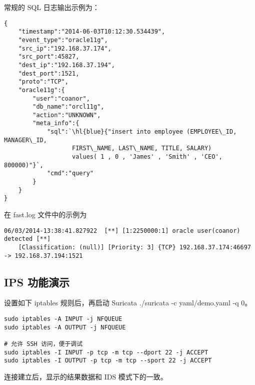 常规的 SQL 日志输出示例为：

\begin{lstlisting}
{
    "timestamp":"2014-06-03T10:12:30.534439",
    "event_type":"oracle11g",
    "src_ip":"192.168.37.174",
    "src_port":45827,
    "dest_ip":"192.168.37.194",
    "dest_port":1521,
    "proto":"TCP",
    "oracle11g":{
        "user":"coanor",
        "db_name":"orcl11g",
        "action":"UNKNOWN",
        "meta_info":{
            "sql":`\hl{blue}{"insert into employee (EMPLOYEE\_ID, MANAGER\_ID,
                   FIRST\_NAME, LAST\_NAME, TITLE, SALARY)
                   values( 1 , 0 , 'James' , 'Smith' , 'CEO', 800000)"}`,
            "cmd":"query"
        }
    }
}
\end{lstlisting}

在 {\ff fast.log} 文件中的示例为

\begin{lstlisting}
06/03/2014-13:38:41.827922  [**] [1:2250000:1] oracle user(coanor) detected [**]
    [Classification: (null)] [Priority: 3] {TCP} 192.168.37.174:46697 -> 192.168.37.194:1521
\end{lstlisting}

\subsection{IPS 功能演示}

设置如下 iptables 规则后，再启动 Suricata {\cf ./suricata -c yaml/demo.yaml -q 0}。

\begin{lstlisting}
sudo iptables -A INPUT -j NFQUEUE
sudo iptables -A OUTPUT -j NFQUEUE

# 允许 SSH 访问，便于调试
sudo iptables -I INPUT -p tcp -m tcp --dport 22 -j ACCEPT
sudo iptables -I OUTPUT -p tcp -m tcp --sport 22 -j ACCEPT
\end{lstlisting}

连接建立后，显示的结果数据和 IDS 模式下的一致。
